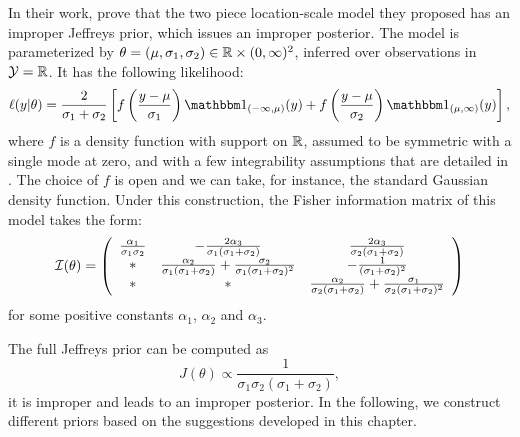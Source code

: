 In their work, \citet{rubio_inference_2014} prove that the two piece location-scale model they proposed has an improper Jeffreys prior, which issues an improper posterior.
The model is parameterized by $\theta=(\mu,\sigma_1,\sigma_2)\in\mathbb{R}\times(0,\infty)^2$, inferred over observations in $\mathcal{Y}=\mathbb{R}$. It has the following likelihood:
    \begin{equation}\label{eq:examplelikilihood}
        \ell(y|\theta) =  \frac{2}{\sigma_1+\sigma_2}\left[f\left(\frac{y-\mu}{\sigma_1}\right)\indic_{(-\infty,\mu)}(y) + f\left(\frac{y-\mu}{\sigma_2}\right)\indic_{(\mu,\infty)}(y)  \right],
    \end{equation}
where $f$ is a density function with support on $\mathbb{R}$, assumed to be symmetric with a single mode at zero, and with a few integrability assumptions that are detailed in \cite{rubio_inference_2014}.
    The choice of $f$ is open and we can take, %
    for instance, the standard Gaussian density function.
    Under this construction, the Fisher information matrix of this model takes the form:
    \begin{equation}\label{eq:fishermatrix}
        \mathcal{I}(\theta) = \left(\begin{array}{ccc}
             \frac{\alpha_1}{\sigma_1\sigma_2}& -\frac{2\alpha_3}{\sigma_1(\sigma_1+\sigma_2)} & \frac{2\alpha_3}{\sigma_2(\sigma_1+\sigma_2)}  \\
             \ast &\frac{\alpha_2}{\sigma_1(\sigma_1+\sigma_2)} + \frac{\sigma_2}{\sigma_1(\sigma_1+\sigma_2)^2} & - \frac{1}{(\sigma_1+\sigma_2)^2}  \\
             \ast&\ast& \frac{\alpha_2}{\sigma_2(\sigma_1+\sigma_2)} + \frac{\sigma_1}{\sigma_2(\sigma_1+\sigma_2)^2}
        \end{array}\right)
    \end{equation}
    for some positive constants $\alpha_1$, $\alpha_2$ and $\alpha_3$.

    The full Jeffreys prior can be computed as 
    \begin{equation}
        J(\theta) \propto \frac{1}{\sigma_1\sigma_2(\sigma_1+\sigma_2)},
    \end{equation}
    it is improper and leads to an improper posterior. In the following, we construct different priors based on the suggestions developed in this chapter. %

